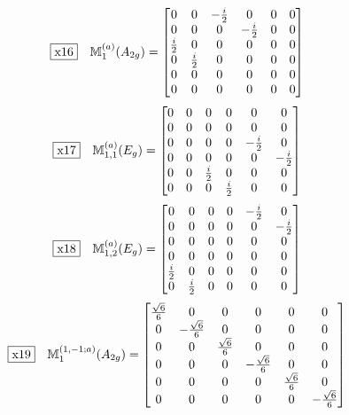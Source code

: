 \documentclass[fleqn,10pt,landscape]{jsarticle}
\begin{document}
\begin{dmath*}
\fbox{x16}\quad \mathbb{M}_{1}^{(a)}(A_{2g})=\begin{bmatrix} 0 & 0 & - \frac{i}{2} & 0 & 0 & 0 \\ 0 & 0 & 0 & - \frac{i}{2} & 0 & 0 \\ \frac{i}{2} & 0 & 0 & 0 & 0 & 0 \\ 0 & \frac{i}{2} & 0 & 0 & 0 & 0 \\ 0 & 0 & 0 & 0 & 0 & 0 \\ 0 & 0 & 0 & 0 & 0 & 0 \end{bmatrix}
\end{dmath*}
\begin{dmath*}
\fbox{x17}\quad \mathbb{M}_{1,1}^{(a)}(E_{g})=\begin{bmatrix} 0 & 0 & 0 & 0 & 0 & 0 \\ 0 & 0 & 0 & 0 & 0 & 0 \\ 0 & 0 & 0 & 0 & - \frac{i}{2} & 0 \\ 0 & 0 & 0 & 0 & 0 & - \frac{i}{2} \\ 0 & 0 & \frac{i}{2} & 0 & 0 & 0 \\ 0 & 0 & 0 & \frac{i}{2} & 0 & 0 \end{bmatrix}
\end{dmath*}
\begin{dmath*}
\fbox{x18}\quad \mathbb{M}_{1,2}^{(a)}(E_{g})=\begin{bmatrix} 0 & 0 & 0 & 0 & - \frac{i}{2} & 0 \\ 0 & 0 & 0 & 0 & 0 & - \frac{i}{2} \\ 0 & 0 & 0 & 0 & 0 & 0 \\ 0 & 0 & 0 & 0 & 0 & 0 \\ \frac{i}{2} & 0 & 0 & 0 & 0 & 0 \\ 0 & \frac{i}{2} & 0 & 0 & 0 & 0 \end{bmatrix}
\end{dmath*}
\begin{dmath*}
\fbox{x19}\quad \mathbb{M}_{1}^{(1,-1;a)}(A_{2g})=\begin{bmatrix} \frac{\sqrt{6}}{6} & 0 & 0 & 0 & 0 & 0 \\ 0 & - \frac{\sqrt{6}}{6} & 0 & 0 & 0 & 0 \\ 0 & 0 & \frac{\sqrt{6}}{6} & 0 & 0 & 0 \\ 0 & 0 & 0 & - \frac{\sqrt{6}}{6} & 0 & 0 \\ 0 & 0 & 0 & 0 & \frac{\sqrt{6}}{6} & 0 \\ 0 & 0 & 0 & 0 & 0 & - \frac{\sqrt{6}}{6} \end{bmatrix}
\end{dmath*}
\end{document}
